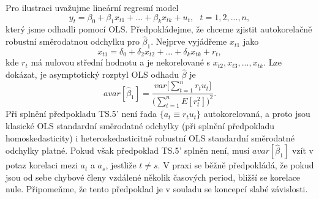 Pro ilustraci uvažujme lineární regresní model
\begin{equation}
y_t = \beta_0 + \beta_1 x_{t1} + ... + \beta_k x_{tk} + u_t, ~~~ t = 1, 2, ..., n,
\end{equation}
který jsme odhadli pomocí OLS. Předpokládejme, že chceme zjistit autokorelačně robustní směrodatnou odchylku pro $\hat{\beta}_1$. Nejprve vyjádřeme $x_{t1}$ jako
\begin{equation}
x_{t1} = \delta_0 + \delta_2 x_{t2} + ... + \delta_k x_{tk} + r_t,
\end{equation}
kde $r_t$ má nulovou střední hodnotu a je nekorelované s $x_{t2}, x_{t3}, ..., x_{tk}$. Lze dokázat, je asymptotický rozptyl OLS odhadu $\hat{\beta}$ je
\begin{equation}
avar[\hat{\beta}_1] = \frac{var\Big[\sum_{t = 1}^n r_t u_t\Big]}{\Big(\sum_{t = 1}^n E[r_t^2]\Big) ^ 2}.
\end{equation}
Při splnění předpokladu TS.5' není řada $\{a_t \equiv r_t u_t\}$ autokorelovaná, a proto jsou klasické OLS standardní směrodatné odchylky (při splnění předpokladu homoskedasticity) i heteroskedasticitně robustní OLS standardní směrodatné odchylky platné. Pokud však předpoklad TS.5' splněn není, musí $avar[\hat{\beta}_1]$ vzít v potaz korelaci mezi $a_t$ a $a_s$, jestliže $t \ne s$. V praxi se běžně předpokládá, že pokud jsou od sebe chybové členy vzdálené několik časových period, bližší se korelace nule. Připomeňme, že tento předpoklad je v souladu se koncepcí slabé závislosti.

